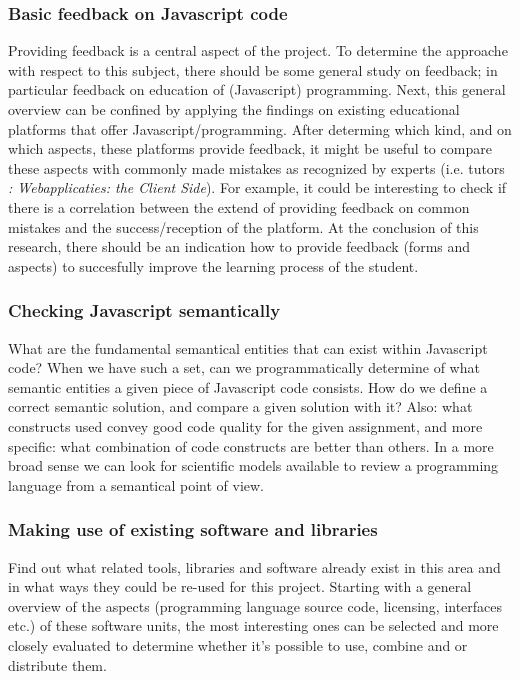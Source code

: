 \documentclass{article}
\begin{document}
\subsubsection{Basic feedback on Javascript code}
Providing feedback is a central aspect of the project. To determine the
approache with respect to this subject, there should be some general study on
feedback; in particular feedback on education of (Javascript)
programming. Next, this general overview can be confined by applying the
findings on existing educational platforms that offer
Javascript/programming. After determing which kind, and on which aspects, these
platforms provide feedback, it might be useful to compare these aspects with
commonly made mistakes as recognized by experts (i.e. tutors {\em:
Webapplicaties: the Client Side}). For example, it could be interesting to
check if there is a correlation between the extend of providing feedback on
common mistakes and the success/reception of the platform. At the conclusion of
this research, there should be an indication how to provide feedback (forms and
aspects) to succesfully improve the learning process of the student.

\subsubsection{Checking Javascript semantically}
What are the fundamental semantical entities that can exist within Javascript
code? When we have such a set, can we programmatically determine of what
semantic entities a given piece of Javascript code consists. How do we define a
correct semantic solution, and compare a given solution with it? Also: what
constructs used convey good code quality for the given assignment, and more
specific: what combination of code constructs are better than others. In a
more broad sense we can look for scientific models available to review a
programming language from a semantical point of view. 

\subsubsection{Making use of existing software and libraries}
Find out what related tools, libraries and software already exist in this area
and in what ways they could be re-used for this project. Starting with a
general overview of the aspects (programming language source code, licensing,
interfaces etc.) of these software units, the most interesting ones can be
selected and more closely evaluated to determine whether it's possible to use,
combine and or distribute them.
\end{document}
